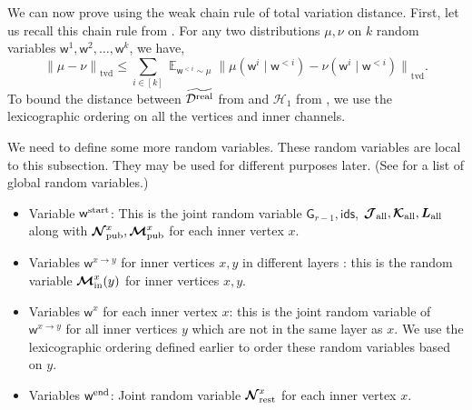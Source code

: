 \documentclass[11pt]{article}
\theoremstyle{definition}
\renewcommand{\leq}{\leqslant}
\newcommand{\tvd}[2]{\ensuremath{\norm{#1 - #2}_{\mathrm{tvd}}}}
\newcommand{\norm}[1]{\ensuremath{\|#1\|}}
\DeclareMathOperator*{\Exp}{\ensuremath{{\mathbb{E}}}}
\newcommand{\rv}[1]{\ensuremath{{\mathsf{#1}}}\xspace}
\newcommand{\cH}{\ensuremath{\mathcal{H}}}
\newcommand{\cD}{\ensuremath{\mathcal{D}}}
\newcommand{\cDreal}{\ensuremath{\cD^{\textnormal{real}}}}
\newcommand{\cDrealtil}{\ensuremath{\widetilde{\cDreal}}}
\newcommand{\rcJall}{\ensuremath{\bm{\mathcal{J}}_{\textnormal{all}}}}
\newcommand{\rcKall}{\ensuremath{\bm{\mathcal{K}}_{\textnormal{all}}}}
\newcommand{\rLall}{\ensuremath{\bm{L}_{\textnormal{all}}}}
\newcommand{\rNpub}[1]{\ensuremath{\bm{\mathcal{N}}_{\textnormal{pub}}^{#1}}}
\newcommand{\rMpub}[1]{\ensuremath{\bm{\mathcal{M}}_{\textnormal{pub}}^{#1}}}
\newcommand{\rMinner}[1]{\ensuremath{\bm{\mathcal{M}}_{\textnormal{in}}^{#1}}}
\newcommand{\rNrest}[1]{\ensuremath{\bm{\mathcal{N}}^{#1}_{\textnormal{rest}}}}
\newcommand{\rG}{\ensuremath{\rv{G}}}
\newcommand{\rids}{\ensuremath{\rv{ids}}}
\newcommand{\rw}{\rv{w}}
\newcommand{\rwstart}{\rv{w}^{\textnormal{start}}}
\newcommand{\rwend}{\rv{w}^{\textnormal{end}}}
\begin{document}
We can now prove  using the weak chain rule of total variation distance. First, let us recall this chain rule from . 
For any two distributions $\mu, \nu$ on $k$ random variables $\rw^1, \rw^2, \ldots, \rw^k$, we have, 
\[
	\tvd{\mu}{\nu} \leq \sum_{i \in [k]} \Exp_{\rw^{<i} \sim \mu} \tvd{\mu(\rw^i \mid \rw^{<i})}{\nu(\rw^{i} \mid \rw^{<i} )}. 
\]
To bound the distance between $\cDrealtil$ from  and $\cH_1$ from , we use the lexicographic ordering on all the vertices and inner channels.  


We need to define some more random variables. These random variables are local to this subsection. They may be used for different purposes later. (See  for a list of global random variables.)
\begin{itemize}
	\item Variable $\rwstart$: This is the joint random variable $\rG_{r-1}, \rids$, $\rcJall, \rcKall, \rLall$ along with $\rNpub{x}, \rMpub{x}$ for each inner vertex $x$. 
	\item Variables $\rw^{x \to y}$ for inner vertices $x, y$ in different layers : this is the random variable $\rMinner{x}(y)$ for inner vertices $x, y$.  
	\item Variables $\rw^{x}$ for each inner vertex $x$: this is the joint random variable of $\rw^{x \to y}$ for all inner vertices $y$ which are not in the same layer as $x$. We use the lexicographic ordering defined earlier to order these random variables based on $y$.  
	\item Variables $\rwend$: Joint random variable $\rNrest{x}$ for each inner vertex $x$. 
\end{itemize}
\end{document}
